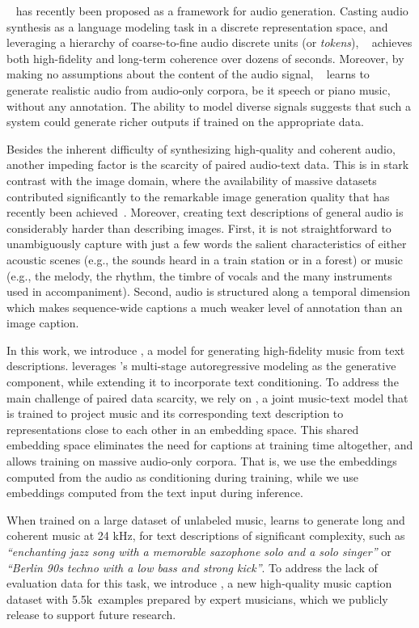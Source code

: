 \audiolm~\cite{audiolm} has recently been proposed as a framework for audio generation. Casting audio synthesis as a language modeling task in a discrete representation space, and leveraging a hierarchy of coarse-to-fine audio discrete units (or \textit{tokens}), \audiolm~ achieves both high-fidelity and long-term coherence over dozens of seconds. Moreover, by making no assumptions about the content of the audio signal, \audiolm~ learns to generate realistic audio from audio-only corpora, be it speech or piano music, without any  annotation. The ability to model diverse signals suggests that such a system could generate richer outputs if trained on the appropriate data.

 Besides the inherent difficulty of synthesizing high-quality and coherent audio, another impeding factor is the scarcity of paired audio-text data. This is in stark contrast with the image domain, where the availability of massive datasets contributed significantly to the remarkable image generation quality that has recently been achieved~\citep{dalle, dalle-2, imagen, parti}. Moreover, creating text descriptions of general audio is considerably harder than describing images. First, it is not straightforward to unambiguously capture with just a few words the salient characteristics of either acoustic scenes (e.g., the sounds heard in a train station or in a forest) or music (e.g., the melody, the rhythm, the timbre of vocals and the many instruments used in accompaniment). Second, audio is structured along a temporal dimension which makes sequence-wide captions a much weaker level of annotation than an image caption.

In this work, we introduce {\model}, a model for generating high-fidelity music from text descriptions. {\model} leverages {\audiolm}'s multi-stage autoregressive modeling as the generative component, while extending it to incorporate text conditioning. To address the main challenge of paired data scarcity, we rely on {\mulan} \citep{mulan}, a joint music-text model that is trained to project music and its corresponding text description to representations close to each other in an embedding space. This shared embedding space eliminates the need for captions at training time altogether, and allows training on massive audio-only corpora. That is, we use the {\mulan} embeddings computed from the audio as conditioning during training, while we use {\mulan} embeddings computed from the text input during inference.

When trained on a large dataset of unlabeled music, {\model} learns to generate long and coherent music at 24 kHz, for text descriptions of significant complexity, such as \textit{``enchanting jazz song with a memorable saxophone solo and a solo singer''} or \textit{``Berlin 90s techno with a low bass and strong kick''}. To address the lack of evaluation data for this task, we introduce {\dataset}, a new high-quality music caption dataset with 5.5k~examples prepared by expert musicians, which we publicly release to support future research.

